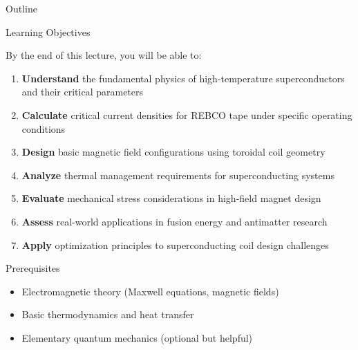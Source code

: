 \begin{frame}{Outline}
    \tableofcontents
\end{frame}

\begin{frame}{Learning Objectives}
    \begin{block}{By the end of this lecture, you will be able to:}
        \begin{enumerate}
            \item \textbf{Understand} the fundamental physics of high-temperature superconductors and their critical parameters
            \item \textbf{Calculate} critical current densities for REBCO tape under specific operating conditions
            \item \textbf{Design} basic magnetic field configurations using toroidal coil geometry
            \item \textbf{Analyze} thermal management requirements for superconducting systems
            \item \textbf{Evaluate} mechanical stress considerations in high-field magnet design
            \item \textbf{Assess} real-world applications in fusion energy and antimatter research
            \item \textbf{Apply} optimization principles to superconducting coil design challenges
        \end{enumerate}
    \end{block}
    
    \begin{alertblock}{Prerequisites}
        \begin{itemize}
            \item Electromagnetic theory (Maxwell equations, magnetic fields)
            \item Basic thermodynamics and heat transfer
            \item Elementary quantum mechanics (optional but helpful)
        \end{itemize}
    \end{alertblock}
\end{frame}

